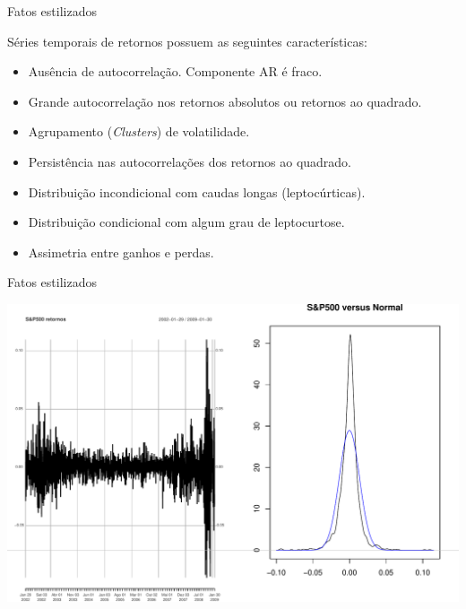 \documentclass[ignorenonframetext,]{beamer}
\begin{document}
\begin{frame}{Fatos estilizados}

Séries temporais de retornos possuem as seguintes características:

\begin{itemize}
\item
  Ausência de autocorrelação. Componente AR é fraco.
\item
  Grande autocorrelação nos retornos absolutos ou retornos ao quadrado.
\item
  Agrupamento (\emph{Clusters}) de volatilidade.
\item
  Persistência nas autocorrelações dos retornos ao quadrado.
\item
  Distribuição incondicional com caudas longas (leptocúrticas).
\item
  Distribuição condicional com algum grau de leptocurtose.
\item
  Assimetria entre ganhos e perdas.
\end{itemize}

\end{frame}

\begin{frame}{Fatos estilizados}

\includegraphics{artigo-apresentacao_files/figure-beamer/sp500ret-1.pdf}

\end{frame}
\end{document}
